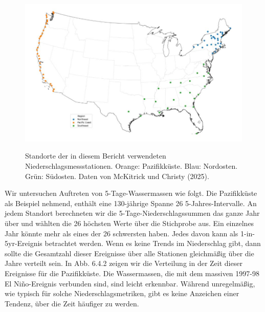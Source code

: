 \documentclass[12pt,paper=a4,DIV=12,parskip=never,chapterprefix=false,headings=standardclasses]{scrreprt}
\begin{document}
\begin{figure}[H]
\begin{center}
\includegraphics[width=1.0\textwidth]{bilder/bilderKlima-0055.jpg}\\[1cm]
\end{center}
\caption{Standorte der in diesem Bericht verwendeten Niederschlagsmessstationen.
Orange: Pazifikküste. Blau: Nordosten. Grün: Südosten. Daten von McKitrick und
Christy (2025).}
\end{figure}

Wir untersuchen Auftreten von 5-Tage-Wassermassen wie folgt. Die Pazifikküste als Beispiel nehmend, enthält eine 130-jährige Spanne 26 5-Jahres-Intervalle. An jedem Standort berechneten wir die 5-Tage-Niederschlagssummen das ganze Jahr über und wählten die 26 höchsten Werte über die Stichprobe aus. Ein einzelnes Jahr könnte mehr als eines der 26 schwersten haben. Jedes davon kann als 1-in-5yr-Ereignis betrachtet werden. Wenn es keine Trends im Niederschlag gibt, dann sollte die Gesamtzahl dieser Ereignisse über alle Stationen gleichmäßig über die Jahre verteilt sein. In Abb. 6.4.2 zeigen wir die Verteilung in der Zeit dieser Ereignisse für die Pazifikküste. Die Wassermassen, die mit dem massiven 1997-98 El Niño-Ereignis verbunden sind, sind leicht erkennbar. Während unregelmäßig, wie typisch für solche Niederschlagsmetriken, gibt es keine Anzeichen einer Tendenz, über die Zeit häufiger zu werden.
\end{document}
